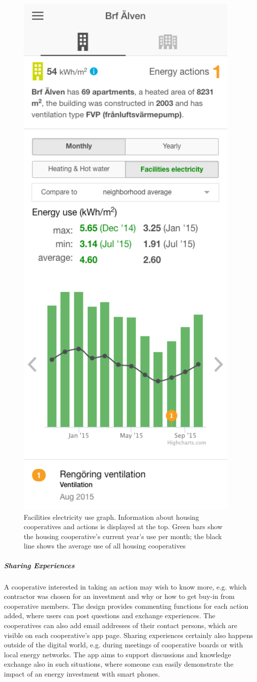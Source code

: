 \begin{figure}[t]
	\sidecaption[t]
\includegraphics[width=.35\linewidth]{img/brf.pdf}
\caption{Facilities electricity use graph. Information about housing cooperatives and actions is displayed at the top. Green bars show the housing cooperative's current year's use per month; the black line shows the average use of all housing cooperatives}
\label{fig:Figure204_Neighbourhood_average} 
\end{figure}

\subparagraph{Sharing Experiences}


A cooperative interested in taking an action may wish to know more, e.g. which contractor was chosen for an investment and why or how to get buy-in from cooperative members. The design provides commenting functions for each action added, where users can post questions and exchange experiences. The cooperatives can also add email addresses of their contact persons, which are visible on each cooperative's app page.
% 
Sharing experiences certainly also happens outside of the digital world, e.g. during meetings of cooperative boards or with local energy networks. The app aims  to support discussions and knowledge exchange also in such situations, where someone can easily demonstrate the impact of an energy investment with smart phones.

